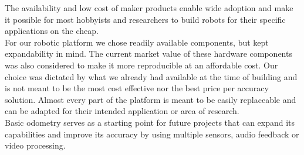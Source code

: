 The availability and low cost of maker products enable wide adoption and make it possible for most hobbyists and 
researchers to build robots for their specific applications on the cheap.\\
For our robotic platform we chose readily available components, but kept expandability in mind. The current market 
value of these hardware components was also considered to make it more reproducible at an affordable cost. Our choice 
was dictated by what we already had available at the time of building and is not meant to be the most cost effective 
nor the best price per accuracy solution. Almost every part of the platform is meant to be easily replaceable and can 
be adapted for their intended application or area of research.\\
Basic odometry serves as a starting point for future projects that can expand its capabilities and improve its accuracy 
by using multiple sensors, audio feedback or video processing.
